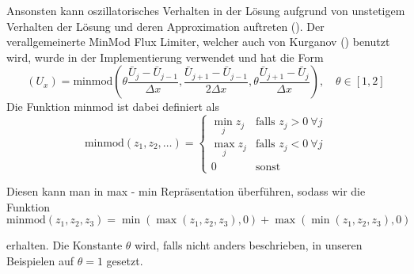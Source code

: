 Ansonsten kann oszillatorisches Verhalten in der Lösung aufgrund von unstetigem Verhalten der Lösung und deren Approximation auftreten (\cite[Abschnitt 6.6]{leveque2002finite}).
Der verallgemeinerte MinMod Flux Limiter, welcher auch von Kurganov (\cite[(4.9)]{kurganov2000new}) benutzt wird, wurde in der Implementierung verwendet und hat die Form
\[
 \left(U_x\right) = \text{minmod}\left(\theta \frac{\bar U_j- \bar U_{j-1}}{\Delta x},\frac{\bar U_{j+1}- \bar U_{j-1}}{2\Delta x},\theta\frac{ \bar U_{j+1}- \bar U_{j}}{\Delta x}  \right), \quad \theta \in [1,2]
\]
Die Funktion minmod ist dabei definiert als
\[
 \text{minmod}(z_1,z_2,\ldots) = \begin{cases}
                                  \min_j z_j & \text{falls }z_j>0~\forall j\\
                                  \max_j z_j & \text{falls }z_j<0~\forall j\\
                                  0 & \text{sonst}
                                 \end{cases}
 \]
 
Diesen kann man in max - min Repräsentation überführen, sodass wir die Funktion
 \begin{equation}
\text{minmod}(z_1,z_2,z_3) = \min(\max(z_1,z_2,z_3),0) + \max(\min(z_1,z_2,z_3),0)    
 \end{equation}

erhalten. Die Konstante $\theta$ wird, falls nicht anders beschrieben, in unseren Beispielen auf $\theta=1$ gesetzt. 

